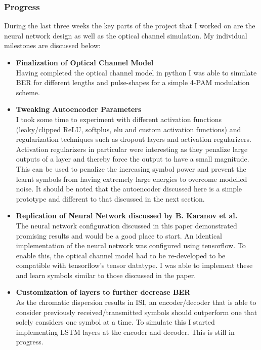 
\subsubsection{Progress}

During the last three weeks the key parts of the project that I worked on are the neural network design as well as the optical channel simulation. My individual milestones are discussed below:
\begin{itemize}
    \item \textbf{Finalization of Optical Channel Model}\\
    Having completed the optical channel model in python I was able to simulate BER for different lengths and pulse-shapes for a simple 4-PAM modulation scheme.
    
    \item \textbf{Tweaking Autoencoder Parameters}\\
    I took some time to experiment with different activation functions (leaky/clipped ReLU, softplus, elu and custom activation functions) and regularization techniques such as dropout layers and activation regularizers. Activation regularizers in particular were interesting as they penalize large outputs of a layer and thereby force the output to have a small magnitude. This can be used to penalize the increasing symbol power and prevent the learnt symbols from having extremely large energies to overcome modelled noise. It should be noted that the autoencoder discussed here is a simple prototype and different to that discussed in the next section.
    
    \item \textbf{Replication of Neural Network discussed by B. Karanov et al. \autocite{8433895}}\\
    The neural network configuration discussed in this paper demonstrated promising results and would be a good place to start. An identical implementation of the neural network was configured using tensorflow. To enable this, the optical channel model had to be re-developed to be compatible with tensorflow's tensor datatype. I was able to implement these and learn symbols similar to those discussed in the paper.
    
    \item \textbf{Customization of layers to further decrease BER}\\
    As the chromatic dispersion results in ISI, an encoder/decoder that is able to consider previously received/transmitted symbols should outperform one that solely considers one symbol at a time. To simulate this I started implementing LSTM layers at the encoder and decoder. This is still in progress.
    
\end{itemize}

